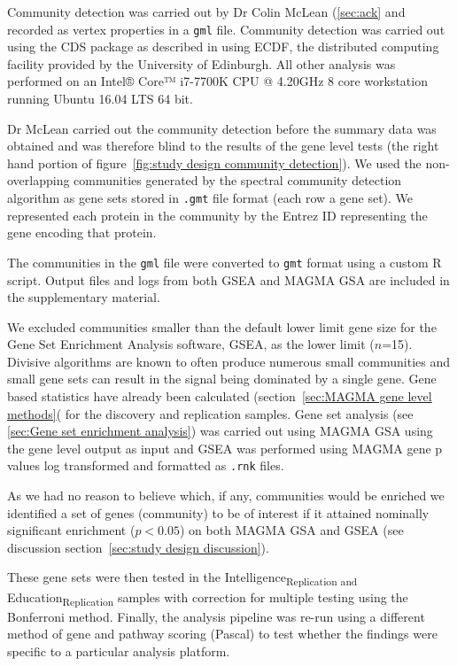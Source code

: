 Community detection was carried out by Dr Colin McLean (\ref{sec:ack} and recorded as vertex properties in a \texttt{gml} file. Community detection was carried out using the CDS package as described in \cite{mclean2016improved} using ECDF, the distributed computing facility provided by the University of Edinburgh. All other analysis was performed on an Intel® Core™ i7-7700K CPU @ 4.20GHz 8 core workstation running Ubuntu 16.04 LTS 64 bit. 

Dr McLean carried out the community detection before the summary data was obtained and was therefore blind to the results of the gene level tests (the right hand portion of figure~\ref{fig:study design community detection}). We used the non-overlapping communities generated by the spectral community detection algorithm as gene sets stored in \texttt{.gmt} file format (each row a gene set). We represented each protein in the community by the Entrez ID representing the gene encoding that protein.

 The communities in the \texttt{gml} file were converted to \texttt{gmt} format using a custom R script. Output files and logs from both GSEA and MAGMA GSA are included in the supplementary material.  



 We excluded communities smaller than the default lower limit gene size for the Gene Set Enrichment Analysis software, GSEA, as the lower limit ($n$=15).  Divisive algorithms  are known to often produce numerous small communities and small gene sets can result in the signal being dominated by a single gene.  Gene based statistics have already been calculated (section~\ref{sec:MAGMA gene level methods}( for the discovery and replication samples. Gene set analysis (see \ref{sec:Gene set enrichment analysis}) was carried out using MAGMA GSA using the gene level output  as input and GSEA was performed using MAGMA gene p values log transformed and formatted as \texttt{.rnk} files.
 
As we had no reason to believe which, if any, communities would be enriched we identified a set of genes (community) to be of interest if it attained nominally significant enrichment ($p<0.05$) on both MAGMA GSA and GSEA (see discussion section~\ref{sec:study design discussion}).

These gene sets were then tested in the Intelligence\textsubscript{Replication and }Education\textsubscript{Replication} samples with correction  for multiple testing using the Bonferroni method. Finally, the analysis pipeline was re-run using a different method of gene and pathway scoring (Pascal) to test whether the findings were specific to a particular analysis platform\cite{lamparter2016fast}.  




